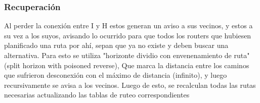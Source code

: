 \documentclass[12pt]{article}
\begin{document}
 


\subsubsection{Recuperación}

Al perder la conexión entre I y H estos generan un aviso a sus vecinos, y estos a su vez a los suyos, avisando lo ocurrido para que todos los routers que hubiesen planificado una ruta por ahí, sepan que ya no existe y deben buscar una alternativa. Para esto se utiliza "horizonte dividio con envenenamiento de ruta"(split horizon with poisoned reverse), Que marca la distancia entre los caminos que sufrieron desconexión con el máximo de distancia (infinito), y luego recursivamente se avisa a los vecinos. Luego de esto, se recalculan todas las rutas necesarias actualizando las tablas de ruteo correspondientes\\



 
\end{document}
